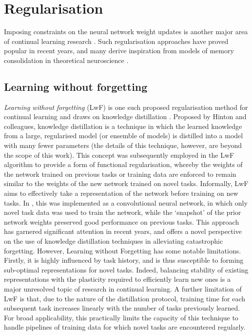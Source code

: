 \documentclass{article} %
\begin{document}
\section*{Regularisation}
\label{headings}

Imposing constraints on the neural network weight updates is another major area of continual learning research \citep{goodfellow2013empirical}. Such regularisation approaches have proved popular in recent years, and many derive inspiration from models of memory consolidation in theoretical neuroscience \citep{fusi2005cascade, losonczy2008compartmentalized}.

\subsection*{Learning without forgetting}

\textit{Learning without forgetting} (LwF) is one such proposed regularisation method for continual learning \citep{li2017learning} and draws on knowledge distillation \citep{hinton2015distilling}. Proposed by Hinton and colleagues, knowledge distillation is a technique in which the learned knowledge from a large, regularised model (or ensemble of models) is distilled into a model with many fewer parameters (the details of this technique, however, are beyond the scope of this work). This concept was subsequently employed in the LwF algorithm to provide a form of functional regularisation, whereby the weights of the network trained on previous tasks or training data are enforced to remain similar to the weights of the new network trained on novel tasks. Informally, LwF aims to effectively take a representation of the network before training on new tasks. In \citet{li2017learning}, this was implemented as a convolutional neural network, in which only novel task data was used to train the network, while the ‘snapshot’ of the prior network weights preserved good performance on previous tasks. This approach has garnered significant attention in recent years, and offers a novel perspective on the use of knowledge distillation techniques in alleviating catastrophic forgetting. However, Learning without Forgetting has some notable limitations. Firstly, it is highly influenced by task history, and is thus susceptible to forming sub-optimal representations for novel tasks. Indeed, balancing stability of existing representations with the plasticity required to efficiently learn new ones is a major unresolved topic of research in continual learning. A further limitation of LwF is that, due to the nature of the distillation protocol, training time for each subsequent task increases linearly with the number of tasks previously learned. For broad applicability, this practically limits the capacity of this technique to handle pipelines of training data for which novel tasks are encountered regularly.
\end{document}
